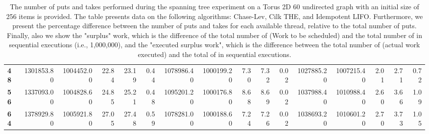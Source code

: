 \begin{table}[!ht]
{\begin{tabular}{lrrrrrrrrrrrrrrr}
\textbf{48} & 1301853.80 & 1004452.00 &          22.84 &       23.19 &                 0.44 & 1078986.40 & 1000199.20 &           7.30 &        7.32 &                 0.02 &      1027885.20 & 1007215.40 &           2.01 &        2.71 &                 0.72 \\
\textbf{56} & 1337093.00 & 1004828.60 &          24.85 &       25.21 &                 0.48 & 1095201.20 & 1000176.80 &           8.68 &        8.69 &                 0.02 &      1037988.40 & 1010988.40 &           2.60 &        3.66 &                 1.09 \\
\textbf{64} & 1378929.80 & 1005921.80 &          27.05 &       27.48 &                 0.59 & 1078281.00 & 1000188.60 &           7.24 &        7.26 &                 0.02 &      1038693.20 & 1010601.20 &           2.70 &        3.73 &                 1.05 \\
\bottomrule
\end{tabular}}
\label{difference-Torus_2D_60_undirected-256-CHASELEV-CILK-IDEMPOTENT_LIFO}
\caption{The number of puts and takes performed during the
    spanning tree experiment on a Torus 2D 60 undirected graph with an initial size
    of 256 items is provided. The table presents data on the
    following algorithms: Chase-Lev, Cilk THE, and
    Idempotent LIFO. Furthermore, we present the percentage difference
    between the number of puts and takes for each available thread,
    relative to the total number of puts. Finally, also we show the
    "surplus" work, which is the difference of the total number of
    \Puts (Work to be scheduled) and the total number of \Puts in
    sequential executions (i.e., 1,000,000), and the "executed surplus
    work", which is the difference between the total number of \Takes
    (actual work executed) and the total of \Takes in sequential
    executions.}
\end{table}
